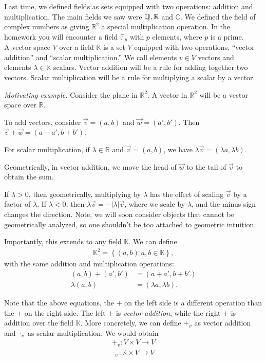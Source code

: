 \documentclass[12pt]{article}
\newcommand{\RR}{\mathbb{R}}
\def\KK{\mathbb{K}}
\begin{document}
Last time, we defined fields as sets equipped with two operations: addition and multiplication.  The main fields we saw were $\QQ, \RR$ and $\mathbb{C}$.  We defined the field of complex numbers as giving $\RR^2$ a special multiplication operation.  In the homework you will encounter a field $\mathbb{F}_p$ with $p$ elements, where $p$ is a prime. \\

  A vector space $V$ over a field $\KK$ is a set $V$ equipped with two operations, ``vector addition'' and ``scalar multiplication.''  We call elements $v \in V$ vectors and elements $\lambda \in \KK$ scalars.  Vector addition will be a rule for adding together two vectors.  Scalar multiplication will be a rule for multiplying a scalar by a vector.

  {\it Motivating example.}  Consider the plane in $\RR^2$.  A vector in $\RR^2$ will be a vector space over $\RR$.  
  
  To add vectors, consider $\vec{v} = (a, b)$ and $\vec{w} = (a', b')$.  Then $\vec{v} + \vec{w} = (a + a', b + b')$.

  For scalar multiplication, if $\lambda \in \RR$ and $\vec{v} = (a, b)$, we have $\lambda \vec{v} = (\lambda a, \lambda b)$.

  Geometrically, in vector addition, we move the head of $\vec{w}$ to the tail of $\vec{v}$ to obtain the sum.  
  
  If $\lambda > 0$, then geometrically, multiplying by $\lambda$ has the effect of scaling $\vec{v}$ by a factor of $\lambda$.  If $\lambda < 0$, then $\lambda \vec{v} = - |\lambda| \vec{v}$, where we scale by $\lambda$, and the minus sign changes the direction.  Note, we will soon consider objects that cannot be geometrically analyzed, so one shouldn't be too attached to geometric intuition.

  Importantly, this extends to any field $\KK$.  We can define
  \begin{align*}
    \KK^2 = \left\{ (a, b) | a, b \in \KK \right\},
  \end{align*}
  with the same addition and multiplication operations:
  \begin{align*}
    (a, b) + (a', b') &= (a + a', b + b') \\
    \lambda (a, b) &= (\lambda a, \lambda b).
  \end{align*}

  Note that the above equations, the $+$ on the left side is a different operation than the $+$ on the right side.  The left $+$ is {\it vector addition}, while the right $+$ is addition over the field $\KK$.  More concretely, we can define $+_v$ as vector addition and $\cdot_v$ as scalar multiplication.  We would obtain
  \begin{align*}
    +_v: V \times V \to V \\
    \cdot_v: \KK \times V \to V
  \end{align*}
\end{document}
